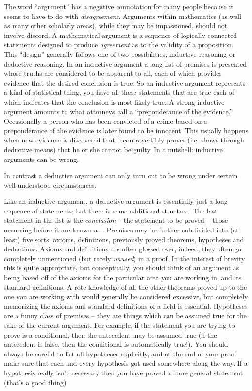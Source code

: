 The word ``argument'' has a negative connotation for many people because 
it seems to have to do with {\em disagreement}.  Arguments within mathematics
(as well as many other scholarly areas), while they may be impassioned, should
not involve discord.  A mathematical argument is a sequence of logically
connected statements designed to produce {\em agreement} as to the validity
of a proposition.  This ``design'' generally follows one of two possibilities,
inductive reasoning or deductive reasoning.  In an inductive argument 
a long list of premises is presented whose truths are considered to be
apparent to all, each of which provides evidence that the desired conclusion
is true.  So an inductive argument represents a kind of statistical thing,
you have all these statements that are true each of which indicates that 
the conclusion is most likely true\ldots  A strong inductive argument
amounts to what attorneys call a ``preponderance of the evidence.''  
Occasionally
a person who has been convicted of a crime based on a preponderance of the 
evidence is later found to be innocent.  This usually happens when new evidence
is discovered that incontrovertibly proves (i.e. shows through deductive
means) that he or she cannot be guilty.  In a nutshell: inductive arguments
can be wrong. 

In contrast a deductive argument can only turn out to be wrong under 
certain well-understood circumstances.

Like an inductive argument, a deductive argument 
is essentially just a
long sequence of statements; but there is some additional structure.
The last statement in the list is the {\em conclusion} -- the statement
to be proved -- those occurring before it are known as 
.
Premises may be further subdivided into (at least) five sorts: axioms,
definitions, previously proved theorems, hypotheses and deductions.  
Axioms and definitions are often glossed
over, indeed, they often go completely unmentioned (but rarely {\em unused}) 
in a proof.  In the interest of brevity this is quite appropriate, but 
conceptually, you should think of an argument as being based off of 
the axioms for the particular area you are working in, and its standard 
definitions.  A rote knowledge of all the other theorems proved up to
the one you are working with would generally be considered excessive, 
but completely memorizing the axioms and standard definitions of a field 
is essential.  Hypotheses are a funny class of premises -- they are things
which can be assumed true for the sake of the current argument.  For
example, if the statement you are trying to prove is a conditional,
then the antecedent may be assumed true (if the antecedent is false,
then the conditional is automatically true!).  You should always be
careful to list all hypotheses explicitly, and at the end of your 
proof make sure that each and every hypothesis got used somewhere 
along the way.  If a hypothesis really isn't necessary then you have
proved a more general statement (that's a good thing). 

